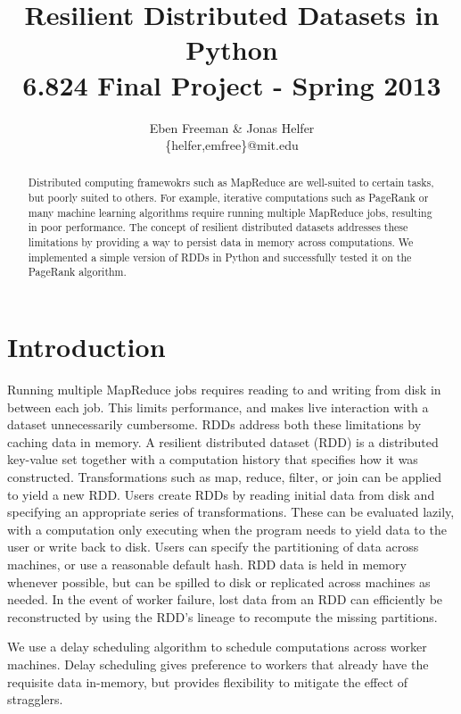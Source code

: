 \documentclass[10pt]{article}
\begin{document}
\title{Resilient Distributed Datasets in Python \\ \small{6.824 Final Project -
Spring 2013}} \author{Eben Freeman \& Jonas Helfer\\
  \small{\{helfer,emfree\}@mit.edu} } \maketitle

\begin{abstract} Distributed computing framewokrs such as MapReduce
  are well-suited to certain tasks, but poorly suited to others. For example,
  iterative computations such as PageRank or many machine learning algorithms
  require running multiple MapReduce jobs, resulting in poor performance. The
  concept of resilient distributed datasets addresses these limitations by
  providing a way to persist data in memory across computations. We implemented
  a simple version of RDDs in Python and successfully tested it on the PageRank algorithm.

\end{abstract} \section*{Introduction} Running multiple MapReduce jobs requires
reading to and writing from disk in between each job. This limits performance,
and makes live interaction with a dataset unnecessarily cumbersome. RDDs address both these limitations by caching data in memory.
A resilient distributed dataset (RDD) is a distributed key-value set together
with a computation history that specifies how it was constructed.\cite{rdd} Transformations
such as map, reduce, filter, or join can be applied to yield a new RDD.
Users create RDDs by reading initial data from disk and specifying an
appropriate series of transformations. These can be evaluated lazily, with a
computation only executing when the program needs to yield data to the user or write back to disk.
Users can specify the partitioning of data across machines, or use a reasonable
default hash. RDD data is held in memory whenever possible, but can
be spilled to disk or replicated across machines as needed. In the event of
worker failure, lost data from an RDD can efficiently be reconstructed by using the RDD's lineage to recompute the missing partitions.

We use a delay scheduling algorithm to schedule computations across worker
machines.\cite{delay} Delay scheduling gives preference to workers that already
have the requisite data in-memory, but provides flexibility to mitigate the
effect of stragglers.
\end{document}
